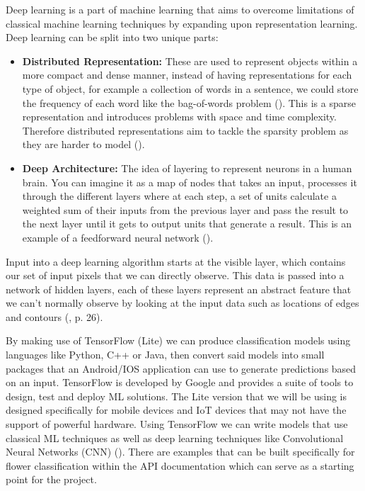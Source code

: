 \documentclass{article}
\begin{document}
\par

Deep learning is a part of machine learning that aims to overcome limitations of classical machine learning techniques 
by expanding upon representation learning. Deep learning can be split into two unique parts:

\begin{itemize}
    \item \textbf{Distributed Representation:} These are used to represent objects within a more compact and dense manner, 
instead of having representations for each type of object, for example a collection of words in a sentence, we could 
store the frequency of each word like the bag-of-words problem (\cite{liu2020representation}). This is a sparse
representation and introduces problems with space and time complexity. Therefore distributed representations aim to 
tackle the sparsity problem as they are harder to model (\cite{Brownlee2017}).
    \item \textbf{Deep Architecture:} The idea of layering to represent neurons in a human brain. You can imagine it as a map of 
nodes that takes an input, processes it through the different layers where at each step, a set of units calculate a 
weighted sum of their inputs from the previous layer and pass the result to the next layer until it gets to output units
that generate a result. This is an example of a feedforward neural network (\cite{lecun2015deep}).
\end{itemize}

\par

Input into a deep learning algorithm starts at the visible layer, which contains our set of input pixels that we can 
directly observe. This data is passed into a network of hidden layers, each of these layers represent an abstract 
feature that we can't normally observe by looking at the input data such as locations of edges and contours 
(\cite{goodfellow2016deep}, p. 26).

\par

By making use of TensorFlow (Lite) we can produce classification models using languages like Python, C++ or Java, then 
convert said models into small packages that an Android/IOS application can use to generate predictions based on an 
input. TensorFlow is developed by Google and provides a suite of tools to design, test and 
deploy ML solutions. The Lite version that we will be using is designed specifically for mobile devices and IoT devices 
that may not have the support of powerful hardware. Using TensorFlow we can write models that use classical ML 
techniques as well as deep learning techniques like Convolutional Neural Networks (CNN) (\cite{googleTF2}). 
There are examples that can be built specifically for flower classification within the API documentation which can serve
as a starting point for the project.
\end{document}
